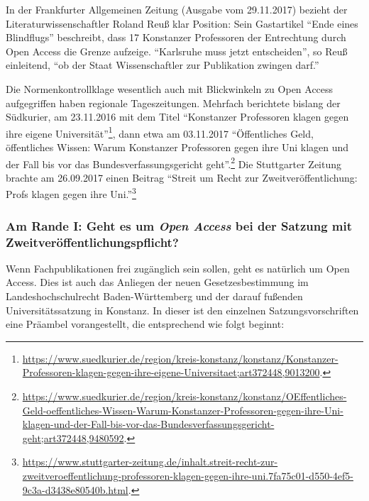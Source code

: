 \documentclass[a4paper,
fontsize=11pt,
oneside,
numbers=noperiodatend,
parskip=half-,
bibliography=totoc,
final
]{scrartcl}
\begin{document}
In der Frankfurter Allgemeinen Zeitung (Ausgabe vom 29.11.2017) bezieht
der Literaturwissenschaftler Roland Reuß klar Position: Sein Gastartikel
\enquote{Ende eines Blindflugs} beschreibt, dass 17 Konstanzer
Professoren der Entrechtung durch Open Access die Grenze aufzeige.
\enquote{Karlsruhe muss jetzt entscheiden}, so Reuß einleitend,
\enquote{ob der Staat Wissenschaftler zur Publikation zwingen darf.}

Die Normenkontrollklage wesentlich auch mit Blickwinkeln zu Open Access
aufgegriffen haben regionale Tageszeitungen. Mehrfach berichtete bislang
der Südkurier, am 23.11.2016 mit dem Titel \enquote{Konstanzer
Professoren klagen gegen ihre eigene Universität}\footnote{\url{https://www.suedkurier.de/region/kreis-konstanz/konstanz/Konstanzer-Professoren-klagen-gegen-ihre-eigene-Universitaet;art372448,9013200}.},
dann etwa am 03.11.2017 \enquote{Öffentliches Geld, öffentliches Wissen:
Warum Konstanzer Professoren gegen ihre Uni klagen und der Fall bis vor
das Bundesverfassungsgericht geht}.\footnote{\url{https://www.suedkurier.de/region/kreis-konstanz/konstanz/OEffentliches-Geld-oeffentliches-Wissen-Warum-Konstanzer-Professoren-gegen-ihre-Uni-klagen-und-der-Fall-bis-vor-das-Bundesverfassungsgericht-geht;art372448,9480592}.}
Die Stuttgarter Zeitung brachte am 26.09.2017 einen Beitrag
\enquote{Streit um Recht zur Zweitveröffentlichung: Profs klagen gegen
ihre Uni.}\footnote{\url{https://www.stuttgarter-zeitung.de/inhalt.streit-recht-zur-zweitveroeffentlichung-professoren-klagen-gegen-ihre-uni.7fa75c01-d550-4ef5-9c3a-d3438e80540b.html}.}

\hypertarget{am-rande-i-geht-es-um-open-access-bei-der-satzung-mit-zweitveruxf6ffentlichungspflicht}{%
\subsubsection{\texorpdfstring{Am Rande I: Geht es um \emph{Open Access}
bei der Satzung mit
Zweit\-ver\-öffent\-lich\-ungs\-pflicht?}{Am Rande I: Geht es um Open Access bei der Satzung mit Zweit\-ver\-öffent\-lich\-ungs\-pflicht?}}\label{am-rande-i-geht-es-um-open-access-bei-der-satzung-mit-zweitveruxf6ffentlichungspflicht}}

Wenn Fachpublikationen frei zugänglich sein sollen, geht es natürlich um
Open Access. Dies ist auch das Anliegen der neuen Gesetzesbestimmung im
Landeshochschulrecht Baden-Württemberg und der darauf fußenden
Universitätssatzung in Konstanz. In dieser ist den einzelnen
Satzungsvorschriften eine Präambel vorangestellt, die entsprechend wie
folgt beginnt:
\end{document}
